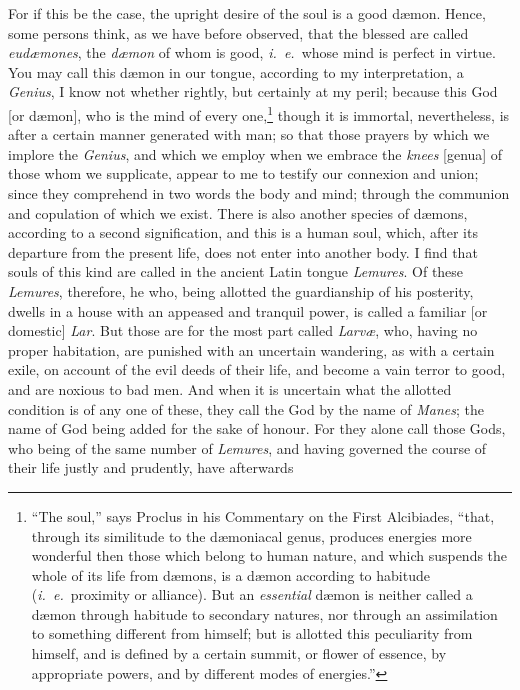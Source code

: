 \documentclass[12pt]{article}
\begin{document}
\noindent For if this be the case, the upright desire of the soul is a good
d{\ae}mon. Hence, some persons think, as we have before observed, that the
blessed are called \textit{eud{\ae}mones}, the \textit{d{\ae}mon} of whom is
good, \textit{i.~e.}~whose mind is perfect in virtue. You may call this
d{\ae}mon in our tongue, according to my interpretation, a \textit{Genius}, I
know not whether rightly, but certainly at my peril; because this God [or
d{\ae}mon], who is the mind of every one,\footnote{\-``The soul,'' says Proclus
in his Commentary on the First Alcibiades, ``that, through its
similitude to the d{\ae}moniacal genus, produces energies more wonderful then
those which belong to human nature, and which suspends the whole of its life
from d{\ae}mons, is a d{\ae}mon according to habitude (\textit{i.~e.}~proximity
or alliance). But an \textit{essential} d{\ae}mon is neither called a d{\ae}mon
through habitude to secondary natures, nor through an assimilation to something
different from himself; but is allotted this peculiarity from himself, and is
defined by a certain summit, or flower of essence, by appropriate powers, and
by different modes of energies.''} though it is immortal, nevertheless, is
after a certain manner generated with man; so that those prayers by which we
implore the \textit{Genius}, and which we employ when we embrace the
\textit{knees} [genua] of those whom we supplicate, appear to me to testify our
connexion and union; since they comprehend in two words the body and mind;
through the communion and copulation of which we exist. There is also another
species of d{\ae}mons, according to a second signification, and this is a human
soul, which, after its departure from the present life, does not enter into
another body. I find that souls of this kind are called in the ancient Latin
tongue \textit{Lemures}. Of these \textit{Lemures}, therefore, he who, being
allotted the guardianship of his posterity, dwells in a house with an appeased
and tranquil power, is called a familiar [or domestic] \textit{Lar}. But those
are for the most part called \textit{Larv{\ae}}, who, having no proper
habitation, are punished with an uncertain wandering, as with a certain exile,
on account of the evil deeds of their life, and become a vain terror to good,
and are noxious to bad men. And when it is uncertain what the allotted
condition is of any one of these, they call the God by the name of
\textit{Manes}; the name of God being added for the sake of honour. For they
alone call those Gods, who being of the same number of \textit{Lemures}, and
having governed the course of their life justly and prudently, have afterwards
\end{document}
